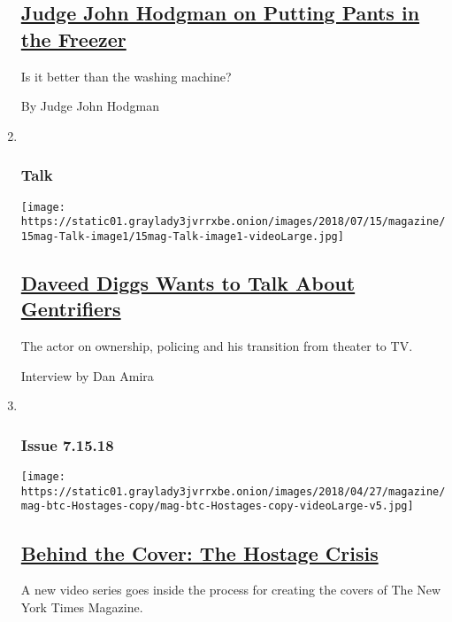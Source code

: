 \begin{enumerate}
  \hypertarget{judge-john-hodgman-on-putting-pants-in-the-freezer}{%
  \subsection{\texorpdfstring{\href{/2018/07/17/magazine/judge-john-hodgman-on-putting-pants-in-the-freezer.html}{Judge
  John Hodgman on Putting Pants in the
  Freezer}}{Judge John Hodgman on Putting Pants in the Freezer}}\label{judge-john-hodgman-on-putting-pants-in-the-freezer}}

  Is it better than the washing machine?

  By Judge John Hodgman
\item ~
  \hypertarget{talk}{%
  \subsubsection{Talk}\label{talk}}

  \texttt{[image: https://static01.graylady3jvrrxbe.onion/images/2018/07/15/magazine/15mag-Talk-image1/15mag-Talk-image1-videoLarge.jpg]}

  \hypertarget{daveed-diggs-wants-to-talk-about-gentrifiers}{%
  \subsection{\texorpdfstring{\href{/2018/07/11/magazine/daveed-diggs-wants-to-talk-about-gentrifiers.html}{Daveed
  Diggs Wants to Talk About
  Gentrifiers}}{Daveed Diggs Wants to Talk About Gentrifiers}}\label{daveed-diggs-wants-to-talk-about-gentrifiers}}

  The actor on ownership, policing and his transition from theater to
  TV.

  Interview by Dan Amira
\item ~
  \hypertarget{issue-71518}{%
  \subsubsection{Issue 7.15.18}\label{issue-71518}}

  \texttt{[image: https://static01.graylady3jvrrxbe.onion/images/2018/04/27/magazine/mag-btc-Hostages-copy/mag-btc-Hostages-copy-videoLarge-v5.jpg]}

  \hypertarget{behind-the-cover-the-hostage-crisis}{%
  \subsection{\texorpdfstring{\href{/2018/07/11/magazine/behind-the-cover-the-hostage-crisis.html}{Behind
  the Cover: The Hostage
  Crisis}}{Behind the Cover: The Hostage Crisis}}\label{behind-the-cover-the-hostage-crisis}}

  A new video series goes inside the process for creating the covers of
  The New York Times Magazine.
\end{enumerate}

